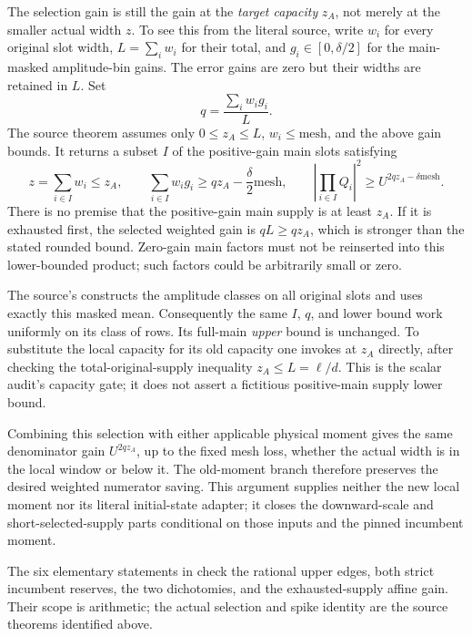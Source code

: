 The selection gain is still the gain at the \emph{target capacity}
$z_A$, not merely at the smaller actual width $z$. To see this
from the literal source, write $w_i$ for every original slot width,
$L=\sum_iw_i$ for their total, and $g_i\in[0,\delta/2]$ for the
main-masked amplitude-bin gains. The error gains are zero but their
widths are retained in $L$. Set
\[
 q=\frac{\sum_iw_i g_i}{L}.
\]
The source theorem  assumes only
$0\le z_A\le L$, $w_i\le\mathrm{mesh}$, and the above gain bounds.
It returns a subset $I$ of the positive-gain main slots satisfying
\[
 z=\sum_{i\in I}w_i\le z_A,\qquad
 \sum_{i\in I}w_i g_i\ge qz_A-\frac\delta2\mathrm{mesh},
 \qquad
 \left|\prod_{i\in I}Q_i\right|^2
 \ge U^{2qz_A-\delta\mathrm{mesh}}.
\]
There is no premise that the positive-gain main supply is at least
$z_A$. If it is exhausted first, the selected weighted gain is
$qL\ge qz_A$, which is stronger than the stated rounded bound.
Zero-gain main factors must not be reinserted into this lower-bounded
product; such factors could be arbitrarily small or zero.

The source's  constructs the
amplitude classes on all original slots and uses exactly this masked
mean. Consequently the same $I$, $q$, and lower bound work uniformly
on its class of rows. Its full-main \emph{upper} bound is unchanged.
To substitute the local capacity for its old capacity one invokes
 at $z_A$ directly, after checking
the total-original-supply inequality $z_A\le L=\ell/d$. This is the
scalar audit's capacity gate; it does not assert a fictitious
positive-main supply lower bound.

Combining this selection with either applicable physical moment
gives the same denominator gain $U^{2qz_A}$, up to the fixed mesh
loss, whether the actual width is in the local window or below it.
The old-moment branch therefore preserves the desired weighted
numerator saving. This argument supplies neither the new local
moment nor its literal initial-state adapter; it closes the
downward-scale and short-selected-supply parts conditional on those
inputs and the pinned incumbent moment.

The six elementary statements in 
check the rational upper edges, both strict incumbent reserves,
the two dichotomies, and the exhausted-supply affine gain. Their
scope is arithmetic; the actual selection and spike identity are
the source theorems identified above.

